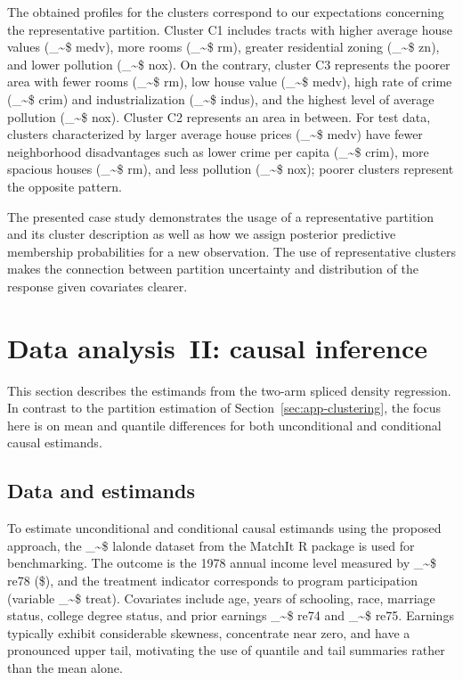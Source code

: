 \documentclass[preprint,12pt,authoryear]{elsarticle}
\makeatletter
\newcommand{\pkg}[1]{\textsf{#1}}
\newcommand{\proglang}[1]{\textsf{#1}}
\newcommand\code{\bgroup\@makeother\_\@makeother\~\@makeother\$\@codex}
\def\@codex#1{{\normalfont\ttfamily\hyphenchar\font=-1 #1}\egroup}
\makeatother
\begin{document}
The obtained profiles for the clusters correspond to our expectations concerning the representative partition. Cluster C1 includes tracts with higher average house values (\code{medv}), more rooms (\code{rm}), greater residential zoning (\code{zn}), and lower pollution (\code{nox}). On the contrary, cluster C3 represents the poorer area with fewer rooms (\code{rm}), low house value (\code{medv}), high rate of crime (\code{crim}) and industrialization (\code{indus}), and the highest level of average pollution (\code{nox}). Cluster C2 represents an area in between. For test data, clusters characterized by larger average house prices (\code{medv}) have fewer neighborhood disadvantages such as lower crime per capita (\code{crim}), more spacious houses (\code{rm}), and less pollution (\code{nox}); poorer clusters represent the opposite pattern.

The presented case study demonstrates the usage of a representative partition and its cluster description as well as how we assign posterior predictive membership probabilities for a new observation. The use of representative clusters makes the connection between partition uncertainty and distribution of the response given covariates clearer.

\section{Data analysis~II: causal inference}
\label{sec:app-causal}

This section describes the estimands from the two-arm spliced density regression. In contrast to the partition estimation of Section~\ref{sec:app-clustering}, the focus here is on mean and quantile differences for both unconditional and conditional causal estimands.

\subsection{Data and estimands}

To estimate unconditional and conditional causal estimands using the proposed approach, the \code{lalonde} dataset from the \pkg{MatchIt} \proglang{R} package is used for benchmarking. The outcome is the 1978 annual income level measured by \code{re78} (\$), and the treatment indicator corresponds to program participation (variable \code{treat}). Covariates include age, years of schooling, race, marriage status, college degree status, and prior earnings \code{re74} and \code{re75}. Earnings typically exhibit considerable skewness, concentrate near zero, and have a pronounced upper tail, motivating the use of quantile and tail summaries rather than the mean alone.
\end{document}
